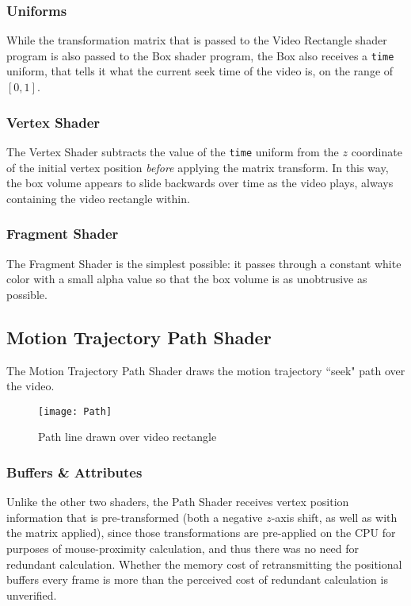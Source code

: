 \subsubsection{Uniforms}
While the transformation matrix that is passed to the Video Rectangle shader program is also passed to the Box shader program, the Box also receives a \texttt{time} uniform, that tells it what the current seek time of the video is, on the range of $[0,1]$.

\subsubsection{Vertex Shader}
The Vertex Shader subtracts the value of the \texttt{time} uniform from the $z$ coordinate of the initial vertex position \emph{before} applying the matrix transform. In this way, the box volume appears to slide backwards over time as the video plays, always containing the video rectangle within.

\subsubsection{Fragment Shader}
The Fragment Shader is the simplest possible: it passes through a constant white color with a small alpha value so that the box volume is as unobtrusive as possible.


\subsection{Motion Trajectory Path Shader}
The Motion Trajectory Path Shader draws the motion trajectory ``seek" path over the video.

\begin{figure}[h]
\centering
\texttt{[image: Path]}
\caption{Path line drawn over video rectangle}
\end{figure}

\subsubsection{Buffers \& Attributes}
Unlike the other two shaders, the Path Shader receives vertex position information that is pre-transformed (both a negative $z$-axis shift, as well as with the matrix applied), since those transformations are pre-applied on the CPU for purposes of mouse-proximity calculation, and thus there was no need for redundant calculation. Whether the memory cost of retransmitting the positional buffers every frame is more than the perceived cost of redundant calculation is unverified.

